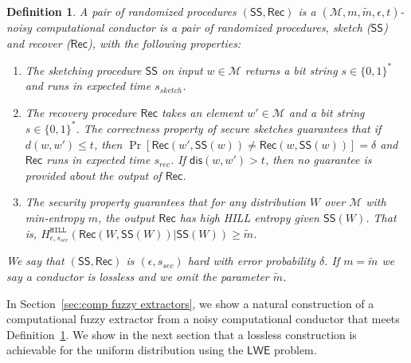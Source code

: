 \documentclass[11pt]{article}
\newcommand{\secref}[1]{\mbox{Section~\ref{#1}}}
\newcommand{\defref}[1]{\mbox{Definition~\ref{#1}}}
\newcommand{\class}[1]{{\ensuremath{\mathsf{#1}}}}
\newcommand{\sketch}{\ensuremath{\class{SS}}\xspace}
\newcommand{\rec}{\ensuremath{\class{Rec}}\xspace}
\newcommand{\dis}{\ensuremath{\mathsf{dis}}}
\newcommand{\hill}{\ensuremath{\mathtt{HILL}}\xspace}
\newcommand{\unp}{\ensuremath{\mathtt{unp}}\xspace}
\newcommand{\LWE}{\class{LWE}}
\newtheorem{definition}[theorem]{Definition}
\begin{document}
\begin{definition}\label{def:comp secure sketch}
A pair of randomized procedures $(\sketch, \rec)$ is a $(\mathcal{M},m, \tilde{m}, \epsilon,  t)$-\emph{noisy computational conductor} is a pair of randomized procedures, sketch (\sketch) and recover (\rec), with the following properties:
\begin{enumerate}
\item The sketching procedure \sketch on input $w\in\mathcal{M}$ returns a bit string $s\in\{0,1\}^*$ and runs in expected time $s_{sketch}$.
\item The recovery procedure \rec takes an element $w'\in\mathcal{M}$ and a bit string $s\in\{0,1\}^*$.  The \emph{correctness} property of secure sketches guarantees that if $d(w,w')\leq t$, then $\Pr[\rec(w',\sketch(w))\neq \rec(w, \sketch(w))] = \delta$ and \rec runs in expected time $s_{rec}$.  If $\dis(w,w')>t$, then no guarantee is provided about the output of \rec.  
\item The \emph{security} property guarantees that for any distribution $W$ over $\mathcal{M}$ with min-entropy $m$, the output $\rec$ has high HILL entropy given $\sketch(W)$.  That is, $H^{\hill}_{\epsilon, s_{sec}}(\rec(W, \sketch(W))|\sketch(W))\geq \tilde{m}$.
\end{enumerate}
We say that $(\sketch, \rec)$ is $(\epsilon, s_{sec})$ hard with error probability $\delta$.
If $m=\tilde{m}$ we say a conductor is \emph{lossless} and we omit the parameter $\tilde{m}$.
\end{definition}
In \secref{sec:comp fuzzy extractors}, we show a natural construction of a computational fuzzy extractor from a noisy computational conductor that meets \defref{def:comp secure sketch}.  We show in the next section that a lossless construction is achievable for the uniform distribution using the $\LWE$ problem.
\end{document}
